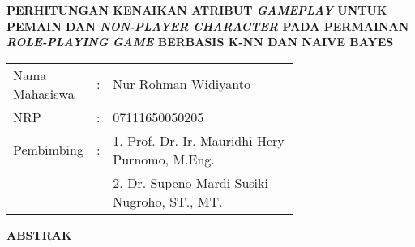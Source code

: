 \begin{spacing}{1}
	\begin{center}
		\large\textbf{PERHITUNGAN KENAIKAN ATRIBUT \textit{GAMEPLAY} UNTUK PEMAIN DAN \textit{NON-PLAYER CHARACTER} PADA PERMAINAN \textit{ROLE-PLAYING GAME} BERBASIS K-NN DAN NAIVE BAYES}
	\end{center}
	\vspace{2ex}
	
	\begin{adjustwidth}{-0.2cm}{}
		\begin{tabular}{lcp{0.7\linewidth}}
			Nama Mahasiswa &:& Nur Rohman Widiyanto \\
			NRP &:&	07111650050205 \\
			Pembimbing &:& 1. Prof. Dr. Ir. Mauridhi Hery Purnomo, M.Eng. \\
			& & 2. Dr. Supeno Mardi Susiki Nugroho, ST., MT. \\
		\end{tabular}
	\end{adjustwidth}
	\vspace{2ex}
	
	\begin{center}
		\large\textbf{ABSTRAK}
	\end{center}
	\vspace{1ex}
	

\end{spacing}
